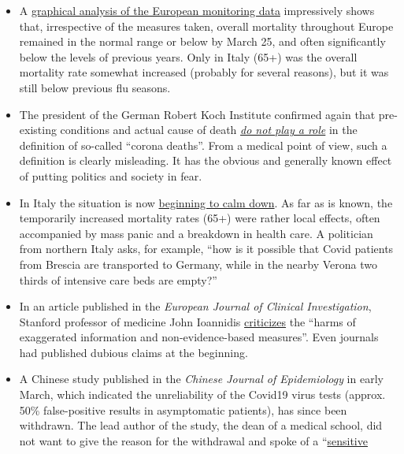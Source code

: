 \begin{itemize}
\tightlist
\item
  A
  \href{https://off-guardian.org/2020/03/30/covid19-yet-to-impact-europes-overall-mortality/}{graphical
  analysis of the European monitoring data} impressively shows that,
  irrespective of the measures taken, overall mortality throughout
  Europe remained in the normal range or below by March 25, and often
  significantly below the levels of previous years. Only in Italy (65+)
  was the overall mortality rate somewhat increased (probably for
  several reasons), but it was still below previous flu seasons.
\item
  The president of the German Robert Koch Institute confirmed again that
  pre-existing conditions and actual cause of death
  \href{https://swprs.org/rki-relativiert-corona-todesfaelle/}{\emph{do
  not play a role}} in the definition of so-called ``corona deaths''.
  From a medical point of view, such a definition is clearly misleading.
  It has the obvious and generally known effect of putting politics and
  society in fear.
\item
  In Italy the situation is now
  \href{https://www.tagesspiegel.de/politik/die-verlangsamung-ist-da-in-italien-zeichnet-sich-die-wende-in-der-coronakrise-ab/25698124.html}{beginning
  to calm down}. As far as is known, the temporarily increased mortality
  rates (65+) were rather local effects, often accompanied by mass panic
  and a breakdown in health care. A politician from northern Italy asks,
  for example, ``how is it possible that Covid patients from Brescia are
  transported to Germany, while in the nearby Verona two thirds of
  intensive care beds are empty?''
\item
  In an article published in the \emph{European Journal of Clinical
  Investigation}, Stanford professor of medicine John Ioannidis
  \href{https://onlinelibrary.wiley.com/doi/abs/10.1111/eci.13222}{criticizes}
  the ``harms of exaggerated information and non-evidence-based
  measures''. Even journals had published dubious claims at the
  beginning.
\item
  A Chinese study published in the \emph{Chinese Journal of
  Epidemiology} in early March, which indicated the unreliability of the
  Covid19 virus tests (approx. 50\% false-positive results in
  asymptomatic patients), has since been withdrawn. The lead author of
  the study, the dean of a medical school, did not want to give the
  reason for the withdrawal and spoke of a
  ``\href{https://www.npr.org/sections/health-shots/2020/03/26/822084429/in-defense-of-coronavirus-testing-strategy-administration-cited-retracted-study}{sensitive
}
\end{itemize}
